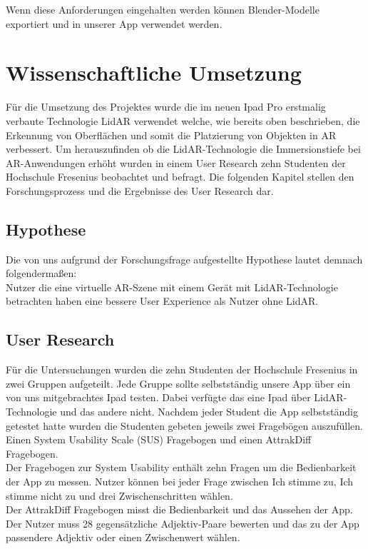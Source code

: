 \documentclass[12pt,a4paper]{article}
\begin{document}
Wenn diese Anforderungen eingehalten werden können Blender-Modelle exportiert und in unserer App verwendet werden.
\section{Wissenschaftliche Umsetzung}
Für die Umsetzung des Projektes wurde die im neuen Ipad Pro erstmalig verbaute Technologie LidAR verwendet welche, wie bereits oben beschrieben, die Erkennung von Oberflächen und somit die Platzierung von Objekten in AR verbessert. Um herauszufinden ob die LidAR-Technologie die Immersionstiefe bei AR-Anwendungen erhöht wurden in einem User Research zehn Studenten der Hochschule Fresenius beobachtet und befragt. Die folgenden Kapitel stellen den Forschungsprozess und die Ergebnisse des User Research dar.
\subsection{Hypothese}
Die von uns aufgrund der Forschungsfrage aufgestellte Hypothese lautet demnach folgendermaßen:\\

\glqq Nutzer die eine virtuelle AR-Szene mit einem Gerät mit LidAR-Technologie betrachten haben eine bessere User Experience als Nutzer ohne LidAR. \grqq{}
\subsection{User Research}
Für die Untersuchungen wurden die zehn Studenten der Hochschule Fresenius in zwei Gruppen aufgeteilt. Jede Gruppe sollte selbstständig unsere App über ein von uns mitgebrachtes Ipad testen. Dabei verfügte das eine Ipad über LidAR-Technologie und das andere nicht. Nachdem jeder Student die App selbstständig getestet hatte wurden die Studenten gebeten jeweils zwei Fragebögen auszufüllen. Einen System Usability Scale (SUS) \cite{SUS} Fragebogen und einen AttrakDiff Fragebogen.\\ 
Der Fragebogen zur System Usability enthält zehn Fragen um die Bedienbarkeit der App zu messen. Nutzer können bei jeder Frage zwischen \glqq Ich stimme zu\grqq, \glqq Ich stimme nicht zu\grqq{} und drei Zwischenschritten wählen.\\ 
Der AttrakDiff Fragebogen misst die Bedienbarkeit und das Aussehen der App. Der Nutzer muss 28 gegensätzliche Adjektiv-Paare bewerten und das zu der App passendere Adjektiv oder einen Zwischenwert wählen.
\end{document}
